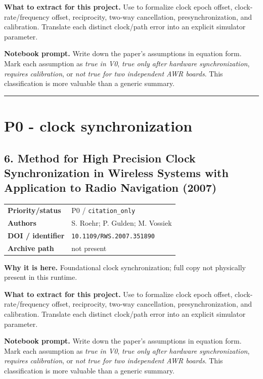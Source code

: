 \documentclass[10.5pt]{article}
\begin{document}
\textbf{What to extract for this project.} Use to formalize clock epoch offset, clock-rate/frequency offset, reciprocity, two-way cancellation, presynchronization, and calibration. Translate each distinct clock/path error into an explicit simulator parameter.

\textbf{Notebook prompt.} Write down the paper's assumptions in equation form. Mark each assumption as \emph{true in V0}, \emph{true only after hardware synchronization}, \emph{requires calibration}, or \emph{not true for two independent AWR boards}. This classification is more valuable than a generic summary.

\vspace{0.35em}\hrule\vspace{0.65em}

\clearpage
\section{P0 - clock synchronization}

\subsection*{6. Method for High Precision Clock Synchronization in Wireless Systems with Application to Radio Navigation (2007)}
\begin{tabularx}{\textwidth}{@{}p{}X@{}}
\textbf{Priority/status} & P0 / \nolinkurl{citation_only} \\
\textbf{Authors} & S. Roehr; P. Gulden; M. Vossiek \\
\textbf{DOI / identifier} & \nolinkurl{10.1109/RWS.2007.351890} \\
\textbf{Archive path} & not present \\
\end{tabularx}
\textbf{Why it is here.} Foundational clock synchronization; full copy not physically present in this runtime.

\textbf{What to extract for this project.} Use to formalize clock epoch offset, clock-rate/frequency offset, reciprocity, two-way cancellation, presynchronization, and calibration. Translate each distinct clock/path error into an explicit simulator parameter.

\textbf{Notebook prompt.} Write down the paper's assumptions in equation form. Mark each assumption as \emph{true in V0}, \emph{true only after hardware synchronization}, \emph{requires calibration}, or \emph{not true for two independent AWR boards}. This classification is more valuable than a generic summary.
\end{document}
